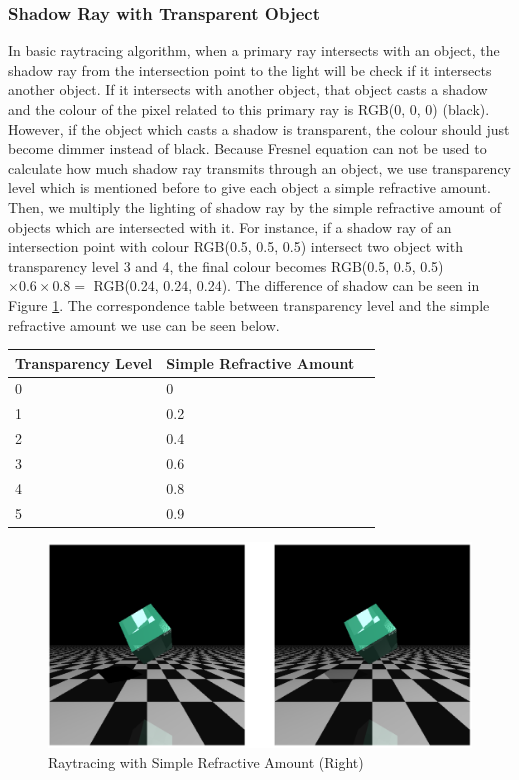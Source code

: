 \documentclass[a4paper, 12pt]{article}
\begin{document}
\subsubsection{Shadow Ray with Transparent Object}
In basic raytracing algorithm, when a primary ray intersects with an object, the shadow ray from the intersection point to the light will be check if it intersects another object. If it intersects with another object, that object casts a shadow and the colour of the pixel related to this primary ray is RGB(0, 0, 0) (black). However, if the object which casts a shadow is transparent, the colour should just become dimmer instead of black. Because Fresnel equation can not be used to calculate how much shadow ray transmits through an object, we use transparency level which is mentioned before to give each object a simple refractive amount. Then, we multiply the lighting of shadow ray by the simple refractive amount of objects which are intersected with it. For instance, if a shadow ray of an intersection point with colour RGB(0.5, 0.5, 0.5) intersect two object with transparency level 3 and 4, the final colour becomes RGB(0.5, 0.5, 0.5) $\times0.6\times0.8=$ RGB(0.24, 0.24, 0.24). The difference of shadow can be seen in Figure \ref{fig:Simple Refractive Amount}. The correspondence table between transparency level and the simple refractive amount we use can be seen below.

\begin{center}
    \begin{tabular}{| l | l | l}
    \hline
    Transparency Level & Simple Refractive Amount \\ \hline
    0 & 0 \\ \hline
    1 & 0.2 \\ \hline
    2 & 0.4 \\ \hline
    3 & 0.6 \\ \hline
    4 & 0.8 \\ \hline
    5 & 0.9 \\ \hline
    \end{tabular}
\end{center}

\begin{figure}[H]
\centering
\includegraphics[scale=0.6]{Simple_Refractive_Amount.png}
\caption{Raytracing with Simple Refractive Amount (Right)}
\label{fig:Simple Refractive Amount}
\end{figure}  
\end{document}

